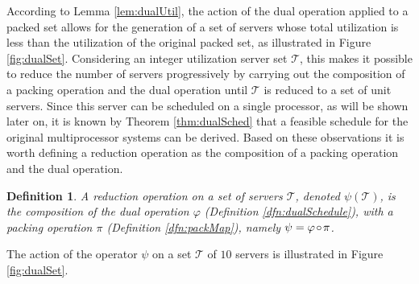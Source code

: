 \documentclass[twocolumn, compsocconf]{IEEEtran}
\newtheorem{definition}{Definition}[section]
\newcommand{\comp}{\mbox{\ensuremath{\mspace{2mu}\circ\mspace{2mu}}}}
\newcommand{\reduc}{\ensuremath{\psi}}\newcommand{\reducMap}{\ensuremath{\psi}}\newcommand{\util}{\ensuremath{\mu}\xspace}
\newcommand{\dual}{\ensuremath{\varphi}}
\newcommand{\pack}{\ensuremath{\pi}}
\newcommand{\servSet}{\ensuremath{\mathcal{T}}}
\newcounter{proc}
\begin{document}
According to Lemma \ref{lem:dualUtil}, the action of the dual operation applied
to a packed set allows for the generation of a set of servers whose total
utilization is less than the utilization of the original packed set, as
illustrated in Figure \ref{fig:dualSet}. Considering an integer utilization
server set $\servSet$, this makes it possible to reduce the number of servers
progressively by carrying out the composition of a packing operation and the
dual operation until $\servSet$ is reduced to a set of unit servers. Since this
server can be scheduled on a single processor, as will be shown later on, it is
known by Theorem \ref{thm:dualSched} that a feasible schedule for the original
multiprocessor systems can be derived. Based on these observations it is worth
defining a reduction operation as the composition of a packing operation and the
dual operation.

\begin{definition}
  A reduction operation on a set of servers $\servSet$, denoted
  $\reduc(\servSet)$, is the composition of the dual operation $\dual$
  (Definition \ref{dfn:dualSchedule}), with a packing operation $\pack$
  (Definition \ref{dfn:packMap}), namely $\reduc = \dual \comp \pack$.
\end{definition}

The action of the operator $\reduc$ on a set $\servSet$ of $10$ servers is
illustrated in Figure \ref{fig:dualSet}.
\end{document}
